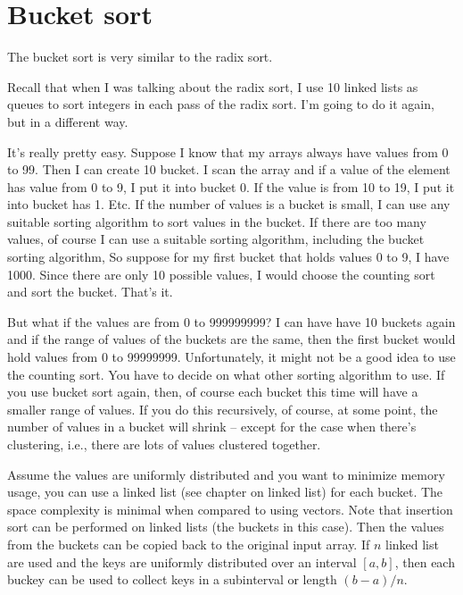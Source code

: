\section{Bucket sort}

The bucket sort is very similar to the radix sort.

Recall that when I was talking about the radix sort, I use
10 linked lists as queues to sort integers in each pass of the radix sort.
I'm going to do it again, but in a different way.

It's really pretty easy.
Suppose I know that my arrays always have values from 0 to 99.
Then I can create 10 bucket.
I scan the array and if a value of the element
has value from 0 to 9, I put it into bucket 0.
If the value is from 10 to 19, I put it into bucket has 1. 
Etc.
If the number of values is a bucket is small,
I can use any suitable sorting algorithm to sort values in the bucket.
If there are too many values, of course I can use a suitable 
sorting algorithm, including the bucket sorting algorithm,
So suppose for my first bucket that holds values 0 to 9, I have 1000.
Since there are only 10 possible values, I would choose the counting sort
and sort the bucket. 
That's it.

But what if the values are from 0 to 999999999?
I can have have 10 buckets again and if the 
range of values of the buckets are the same, then
the first bucket would hold values from 0 to 99999999.
Unfortunately, it might not be a good idea to use the counting sort.
You have to decide on what other sorting algorithm to use.
If you use bucket sort again, then, of course each bucket this
time will have a smaller range of values.
If you do this recursively, of course, at some point, the number of
values in a bucket will shrink -- except for the case when there's clustering,
i.e., there are lots of values clustered
together.

Assume the values are uniformly distributed
and you want to minimize memory usage, you can use a linked list (see chapter
on linked list) for each bucket.
The space complexity is minimal when compared to using vectors.
Note that insertion sort can be performed on linked lists (the buckets in
this case).
Then the values from the buckets can be copied back to the original input
array.
If $n$ linked list are used and the keys are uniformly distributed
over an interval $[a, b]$, then each buckey can be used to collect
keys in a subinterval or length $(b - a)/n$.


